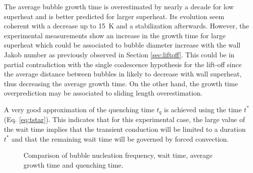 \npar

The average bubble growth time is overestimated by nearly a decade for low superheat and is better predicted for larger superheat. Its evolution seem coherent with a decrease up to 15\ K and a stabilization afterwards. However, the experimental measurements show an increase in the growth time for large superheat which could be associated to bubble diameter increase with the wall Jakob number as previously observed in Section \ref{sec:liftoff}. This could be in partial contradiction with the single coalescence hypothesis for the lift-off since the average distance between bubbles in likely to decrease with wall superheat, thus decreasing the average growth time. On the other hand, the growth time overprediction may be associated to sliding length overestimation.

\npar

A very good approximation of the quenching time $t_{q}$ is achieved using the time $t^{*}$ (Eq. \ref{eq:tstar}). This indicates that for this experimental case, the large value of the wait time implies that the transient conduction will be limited to a duration $t^{*}$ and that the remaining wait time will be governed by forced convection. 

\begin{figure}[!h]
\caption{Comparison of bubble nucleation frequency, wait time, average growth time and quenching time.}
\label{fig:fullkoss_times}
\end{figure}





